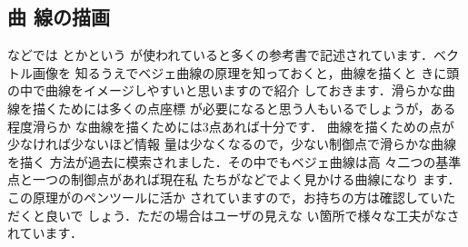 \subsection{曲
  線の描画}
%
{}などでは{}
とか{}という{}
が使われていると多くの参考書で記述されています．ベクトル画像を
知るうえでベジェ曲線の原理を知っておくと，曲線を描くと
きに頭の中で曲線をイメージしやすいと思いますので紹介
しておきます．滑らかな曲線を描くためには多くの点座標
が必要になると思う人もいるでしょうが，ある程度滑らか
な曲線を描くためには3点あれば十分です．
曲線を描くための点が少なければ少ないほど情報
量は少なくなるので，少ない制御点で滑らかな曲線を描く
方法が過去に模索されました．その中でもベジェ曲線は高
々二つの基準点と一つの制御点があれば現在私
たちがなどでよく見かける曲線になり
ます．この原理がのペンツールに活か
されていますので，お持ちの方は確認していただくと良いで
しょう．ただの場合はユーザの見えな
い箇所で様々な工夫がなされています．

